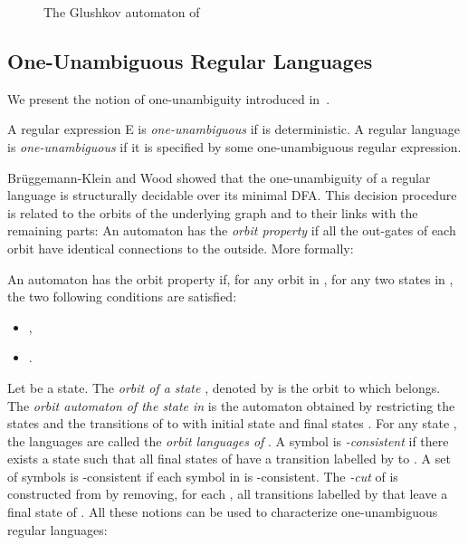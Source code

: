 \documentclass{llncs}
\begin{document}
\begin{figure}[H]
	\centering
	

  \caption{The Glushkov automaton  of }
  \label{ExempleGlushkov}
\end{figure}


\subsection{One-Unambiguous Regular Languages}
	We present the notion of one-unambiguity introduced in~\cite{BW98}.

\begin{definition}
	A regular expression E is \emph{one-unambiguous} if  is deterministic.
	A regular language is \emph{one-unambiguous} if it is specified by some one-unambiguous regular expression.
\end{definition}

	Brüggemann-Klein and Wood showed that the one-unambiguity of a regular language is structurally decidable over its minimal DFA. This decision procedure is related to the orbits of the underlying graph and to their links with the remaining parts:
	An automaton has the \emph{orbit property} if all the out-gates of each orbit have identical connections to the outside.
	More formally:
	
\begin{definition}
	An automaton  has the orbit property if, for any orbit  in , for any two states  in , the two following conditions are satisfied:
	\begin{itemize}
		\item ,
		\item .
	\end{itemize}
\end{definition}
	Let  be a state. 
	The \emph{orbit of a state }, denoted by  is the orbit to which  belongs.
	The \emph{orbit automaton}  \emph{of the state  in } is the automaton obtained by restricting the states and the transitions of  to  with initial state  and final states . For any state , the languages  are called the \emph{orbit languages of }.
	A symbol  is \emph{-consistent} if there exists a state  such that all final states of  have a transition labelled by  to . 
	A set  of symbols is -consistent if each symbol in  is -consistent.
The \emph{-cut}  of  is constructed from  by removing, for each , all transitions labelled by  that leave a final state of .
	All these notions can be used to characterize one-unambiguous regular languages:
\end{document}
